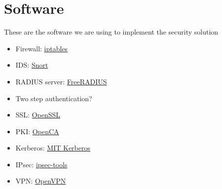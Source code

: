 \section*{Software}

These are the software we are using to implement the security solution

\begin{itemize}
    \item Firewall: \href{http://en.wikipedia.org/wiki/Iptables}{iptables}
    \item IDS: \href{https://www.snort.org/}{Snort}    
    \item RADIUS server: \href{http://freeradius.org/}{FreeRADIUS}
    \item Two step authentication?
    \item SSL: \href{http://www.openssl.org/}{OpenSSL}
    \item PKI: \href{https://pki.openca.org/}{OpenCA}
    \item Kerberos: \href{http://web.mit.edu/kerberos/}{MIT Kerberos}
    \item IPsec: \href{http://ipsec-tools.sourceforge.net/}{ipsec-tools}
    \item VPN: \href{http://openvpn.net/}{OpenVPN}
\end{itemize}